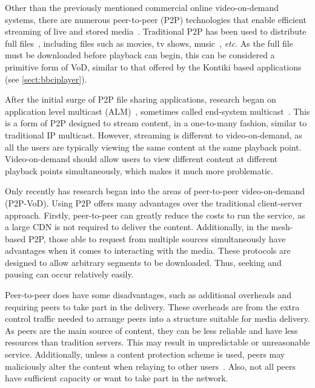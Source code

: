     Other than the previously mentioned commercial online video-on-demand systems, there are numerous peer-to-peer (P2P) technologies that enable efficient streaming of live and stored media~\cite{liu2008spp,li2007ess}. Traditional P2P has been used to distribute full files~\cite{cohen03ibr,emule,gnutella}, including files such as movies, tv shows, music~\cite{napster}, \emph{etc}. As the full file must be downloaded before playback can begin, this can be considered a primitive form of VoD, similar to that offered by the Kontiki based applications (see \autoref{sect:bbciplayer}).

    After the initial surge of P2P file sharing applications, research began on application level multicast (ALM)~\cite{yeo2004sal}, sometimes called end-system multicast~\cite{chu2002ces}.  This is a form of P2P designed to stream content, in a one-to-many fashion, similar to traditional IP multicast. However, streaming is different to video-on-demand, as all the users are typically viewing the same content at the same playback point.  Video-on-demand should allow users to view different content at different playback points simultaneously, which makes it much more problematic.

    Only recently has research began into the areas of peer-to-peer video-on-demand (P2P-VoD). Using P2P offers many advantages over the traditional client-server approach. Firstly, peer-to-peer can greatly reduce the costs to run the service, as a large CDN is not required to deliver the content. Additionally, in the mesh-based P2P, those able to request from multiple sources simultaneously have advantages when it comes to interacting with the media. These protocols are designed to allow arbitrary segments to be downloaded. Thus, seeking and pausing can occur relatively easily.

    Peer-to-peer does have some disadvantages, such as additional overheads and requiring peers to take part in the delivery. These overheads are from the extra control traffic needed to arrange peers into a structure suitable for media delivery. As peers are the main source of content, they can be less reliable and have less resources than tradition servers. This may result in unpredictable or unreasonable service. Additionally, unless a content protection scheme is used, peers may maliciously alter the content when relaying to other users~\cite{dhungel2007pap}. Also, not all peers have sufficient capacity or want to take part in the network.

